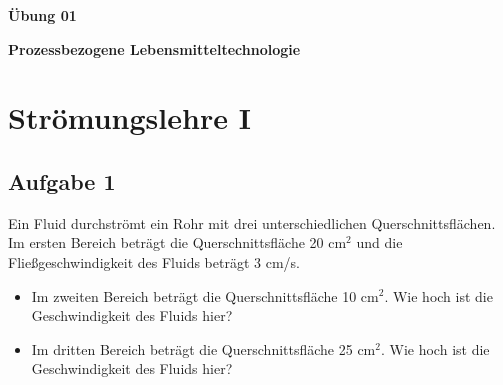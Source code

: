 \documentclass[a4paper,11pt]{article}
\newif\ifshowme
\begin{document}


\bckgrnd


\begin{center}
\LARGE
\color{white}
\textbf{Übung 01} \par \vspace*{2mm}
\large \color{miugray} \textbf{Prozessbezogene Lebensmitteltechnologie}
\end{center}
\par 
\vspace*{6mm}


\color{miudiutex}
\section*{Strömungslehre I}

\subsection*{Aufgabe 1}
Ein Fluid 
durchströmt ein Rohr mit drei unterschiedlichen Querschnittsflächen. 
Im ersten Bereich beträgt die Querschnittsfläche 20 cm$^2$ und die Fließgeschwindigkeit des Fluids beträgt 3 cm/s.
\begin{itemize}
\item Im zweiten Bereich beträgt die Querschnittsfläche 10 cm$^2$. Wie hoch ist die Geschwindigkeit des Fluids hier?
\item Im dritten Bereich beträgt die Querschnittsfläche 25 cm$^2$. Wie hoch ist die Geschwindigkeit des Fluids hier?

\end{itemize}

\ifshowme
\antwort{
Kontinuitätsgleichung
\begin{align*}
A_1 \cdot v_1 = A_2 \cdot v_2 \\
v_2 = \frac{A_1 \cdot v_1}{A_2}
\end{align*}
Einsetzen a) und b):
\begin{align*}
a) &&v_2 &= \frac{20\cm^2 \cdot 3\mskip3mu \cm/\text{s}}{10\mskip3mu \cm^2} &&= 6\cm/\text{s} \\
b) &&v_2 &= \frac{20\cm^2 \cdot 3\mskip3mu \cm/\text{s}}{25\mskip3mu \cm^2} &&=2,4\cm/\text{s}
\end{align*}
}
\pagebreak
\else
\fi
\end{document}
